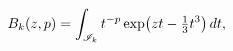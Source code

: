 \[\mathop{B_{k}\/}\nolimits\!\left(z,p\right)=\int_{\mathscr{I}_{k}}t^{-p}%
\mathop{\exp\/}\nolimits\!\left(zt-\tfrac{1}{3}t^{3}\right)dt,\]